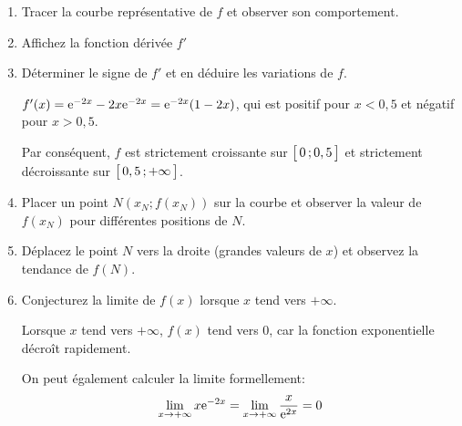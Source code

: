 \documentclass[11pt, a4paper]{report}
\begin{document}
\begin{enumerate}[resume]
    \item Tracer la courbe représentative de $f$ et observer son comportement. 
    \item Affichez la fonction dérivée $f'$  
    \item Déterminer le signe de $f'$ et en déduire les variations de $f$. 
     \begin{blocvisible}[height=4]
        \begin{minipage}{0.58\linewidth}
            $f'(x) = \mathrm{e}^{-2x} - 2x \mathrm{e}^{-2x} = \mathrm{e}^{-2x}(1 - 2x)$, qui est positif pour $x < 0,5$ et négatif pour $x > 0,5$.

        Par conséquent, $f$ est strictement croissante sur $\bigl[ \, 0 \, ; 0,5 \,\bigl]$ et strictement décroissante sur $\bigl[ \, 0,5 \, ; +\infty \,\bigl]$.
        \end{minipage}\hfill
        \begin{minipage}{0.4\linewidth}
        \end{minipage}
    \end{blocvisible}
    \item Placer un point $N\left(x_N; f(x_N)\right)$ sur la courbe et observer la valeur de $f(x_N)$ pour différentes positions de $N$.        
    \item Déplacez le point $N$ vers la droite (grandes valeurs de $x$) et observez la tendance de $f(N)$. 
    \item Conjecturez la limite de $f(x)$ lorsque $x$ tend vers $+\infty$.  
    
    \begin{blocvisible}[height=3]
        Lorsque $x$ tend vers $+\infty$, $f(x)$ tend vers 0, car la fonction exponentielle décroît rapidement.

        On peut également calculer la limite formellement:
        \[\lim_{x \to +\infty} x \mathrm{e}^{-2x} = \lim_{x \to +\infty} \frac{x}{\mathrm{e}^{2x}}=  0\]
    \end{blocvisible}
\end{enumerate}

\bigskip

\pagebreak
\thispagestyle{DS_LP}
\end{document}
